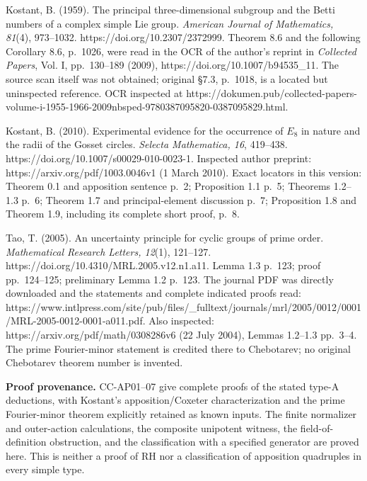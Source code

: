 Kostant, B. (1959). The principal three-dimensional subgroup and the
Betti numbers of a complex simple Lie group. \emph{American Journal of
Mathematics, 81}(4), 973--1032. https://doi.org/10.2307/2372999. Theorem
8.6 and the following Corollary 8.6, p.~1026, were read in the OCR of
the author's reprint in \emph{Collected Papers}, Vol. I, pp.~130--189
(2009), https://doi.org/10.1007/b94535\_11. The source scan itself was
not obtained; original §7.3, p.~1018, is a located but uninspected
reference. OCR inspected at
https://dokumen.pub/collected-papers-volume-i-1955-1966-2009nbsped-9780387095820-0387095829.html.

Kostant, B. (2010). Experimental evidence for the occurrence of \(E_8\)
in nature and the radii of the Gosset circles. \emph{Selecta
Mathematica, 16}, 419--438. https://doi.org/10.1007/s00029-010-0023-1.
Inspected author preprint: https://arxiv.org/pdf/1003.0046v1 (1 March
2010). Exact locators in this version: Theorem 0.1 and apposition
sentence p.~2; Proposition 1.1 p.~5; Theorems 1.2--1.3 p.~6; Theorem 1.7
and principal-element discussion p.~7; Proposition 1.8 and Theorem 1.9,
including its complete short proof, p.~8.

Tao, T. (2005). An uncertainty principle for cyclic groups of prime
order. \emph{Mathematical Research Letters, 12}(1), 121--127.
https://doi.org/10.4310/MRL.2005.v12.n1.a11. Lemma 1.3 p.~123; proof
pp.~124--125; preliminary Lemma 1.2 p.~123. The journal PDF was directly
downloaded and the statements and complete indicated proofs read:
https://www.intlpress.com/site/pub/files/\_fulltext/journals/mrl/2005/0012/0001/MRL-2005-0012-0001-a011.pdf.
Also inspected: https://arxiv.org/pdf/math/0308286v6 (22 July 2004),
Lemmas 1.2--1.3 pp.~3--4. The prime Fourier-minor statement is credited
there to Chebotarev; no original Chebotarev theorem number is invented.

\textbf{Proof provenance.} CC-AP01--07 give complete proofs of the
stated type-A deductions, with Kostant's apposition/Coxeter
characterization and the prime Fourier-minor theorem explicitly retained
as known inputs. The finite normalizer and outer-action calculations,
the composite unipotent witness, the field-of-definition obstruction,
and the classification with a specified generator are proved here. This
is neither a proof of RH nor a classification of apposition quadruples
in every simple type.
